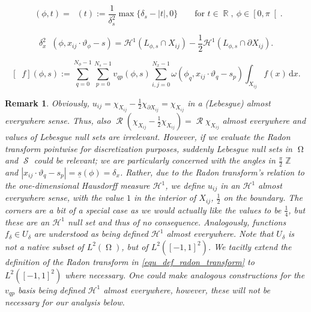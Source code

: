 \documentclass[10pt,a4paper]{amsart}
\newtheorem{remark}{Remark}
\DeclareMathOperator{\GenRadon}{\mathcal{R}^\omega_{\delta}}
\DeclareMathOperator{\PixelWeight}{\omega^\mathrm{pd}_{\delta_\mathit{s}}}
\DeclareMathOperator{\RR}{\mathbb{R}}
\DeclareMathOperator{\Radon}{\mathcal{R}}
\DeclareMathOperator{\RayWeight}{\omega^\mathrm{rd}_{\delta_\mathit{x}}}
\DeclareMathOperator{\ZZ}{\mathbb{Z}}
\newcommand{\dd}[1]{\,\mathrm{d}{#1}}
\DeclareMathOperator{\imgdom}{\Omega}
\DeclareMathOperator{\sinodom}{\mathcal{S}}
\newcommand{\sumphi}{\sum_{q=0}^{N_\phi-1}}
\newcommand{\sums}{\sum_{p=0}^{N_s-1}}
\newcommand{\sumx}{\sum_{i,j=0}^{N_x-1}}
\begin{document}
\begin{equation}\label{equ_def_pixel_weight}
\PixelWeight(\phi,t)=\PixelWeight(t):= \frac{1}{\delta_s^2} \max\{\delta_s-|t|,0\} \qquad \text{for } t\in \RR, \  \phi\in \left [0,\pi\right[.
\end{equation}

\begin{equation} \label{equ_lemma_intersectionlength}
\delta_x^2 \RayWeight(\phi,x_{ij}\cdot \vartheta_\phi - s)= \mathcal{H}^1(L_{\phi,s}\cap X_{ij}) - \frac 1 2 \mathcal{H}^1(L_{\phi,s}\cap \partial X_{ij}) .
\end{equation}

    \begin{equation}\label{equ_def_convolutional_Radon_transform}
[\GenRadon f](\phi,s) := \sumphi\sums v_{qp}(\phi,s) \sumx \omega (\phi_q,x_{ij}\cdot \vartheta_q -s_p) \int_{X_{ij}} f(x) \dd x.
    \end{equation}

\begin{remark} \label{remark_using_hausdorff_ae}
Obviously, $u_{ij}=\chi_{X_{ij}}- \frac{1}{2} \chi_{\partial X_{ij}}=\chi_{X_{ij}}$ in a (Lebesgue) almost everywhere sense. Thus, also $\Radon (\chi_{X_{ij}}- \frac{1}{2} \chi_{X_{ij}})= \Radon \chi_{X_{ij}}$ almost everywhere and values of Lebesgue null sets are irrelevant.
However, if we evaluate the Radon transform pointwise for discretization purposes, suddenly Lebesgue null sets in $\imgdom$ and $\sinodom$ could be relevant; we are particularly concerned with the angles in $\frac{\pi}{2}\ZZ$ and $|x_{ij}\cdot \vartheta_q-s_p|=\underline s(\phi)=\delta_x$. Rather, due to the Radon transform's relation to the one-dimensional Hausdorff measure $\mathcal{H}^1$, we define $u_{ij}$ in an $\mathcal{H}^1$ almost everywhere sense, with the value $1$ in the interior of $X_{ij}$, $\frac{1}{2}$ on the boundary. The corners are a bit of a special case as we would actually like the values to be $\frac{1}{4}$, but these are an $\mathcal{H}^1$ null set and thus of no consequence. Analogously, functions $f_\delta\in U_\delta$ are understood as being defined $\mathcal{H}^1$ almost everywhere. Note that $U_\delta$ is not a native subset of $L^2(\imgdom)$, but of $L^2([-1,1]^2)$. We tacitly extend the definition of the Radon transform in \eqref{equ_def_radon_transform} to $L^2([-1,1]^2)$ where necessary. One could make analogous constructions for the $v_{qp}$ basis being defined $\mathcal{H}^1$ almost everywhere, however, these will not be necessary for our analysis below.

\end{remark}
\end{document}
